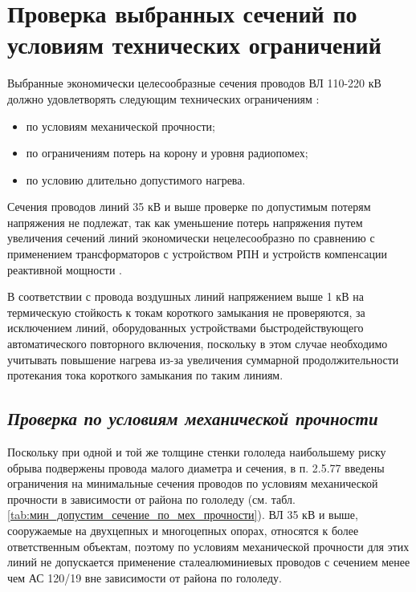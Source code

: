 \section{Проверка выбранных сечений по условиям технических ограничений}

Выбранные экономически целесообразные сечения проводов ВЛ 110-220 кВ должно удовлетворять следующим технических ограничениям \cite{глазунов_шведов}:
\begin{itemize}
	\item по условиям механической прочности;
	\item по ограничениям потерь на корону и уровня радиопомех;
	\item по условию длительно допустимого нагрева.
\end{itemize}

Сечения проводов линий 35 кВ и выше проверке по допустимым потерям напряжения не подлежат, так как уменьшение потерь напряжения путем увеличения сечений линий экономически нецелесообразно по сравнению с применением трансформаторов с устройством РПН и устройств компенсации реактивной мощности \cite{файбисович}. 

В соответствии с \cite{пуэ7} провода воздушных линий напряжением выше 1 кВ на термическую стойкость к токам короткого замыкания не проверяются, за исключением линий, оборудованных устройствами быстродействующего автоматического повторного включения, поскольку в этом случае необходимо учитывать повышение нагрева из-за увеличения суммарной продолжительности протекания тока короткого замыкания по таким линиям.

\subsection*{\textit{Проверка по условиям механической прочности}}

Поскольку при одной и той же толщине стенки гололеда наибольшему риску обрыва подвержены провода малого диаметра и сечения, в п. 2.5.77 \cite{пуэ7} введены ограничения на минимальные сечения проводов по условиям механической прочности в зависимости от района по гололеду (см. табл. \ref{tab:мин_допустим_сечение_по_мех_прочности}). ВЛ 35 кВ и выше, сооружаемые на двухцепных и многоцепных опорах, относятся к более ответственным объектам, поэтому по условиям механической прочности для этих линий не допускается применение сталеалюминиевых проводов с сечением менее чем АС 120/19 вне зависимости от района по гололеду.

